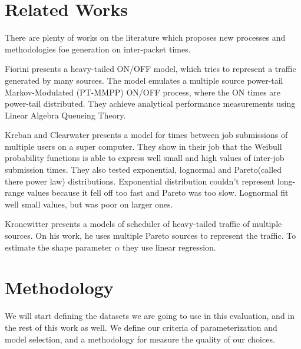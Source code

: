 \section{Related Works}

There are plenty of works on the literature which proposes new processes and methodologies foe generation on inter-packet times.

Fiorini \cite{modeling-concurrent-heavy-tailed} presents a heavy-tailed ON/OFF model, which tries to represent a traffic generated by many sources. The model emulates a multiple source power-tail Markov-Modulated (PT-MMPP) ON/OFF process, where the ON times are power-tail distributed. They achieve analytical performance measurements using Linear Algebra Queueing Theory.

Kreban and Clearwater\cite{hierarchical-dynamics-interarrival-times} presents a model for times between job submissions of multiple users on a super computer. They show in their job that the Weibull probability functions is able to express well small and high values of inter-job submission times. They also tested exponential, lognormal and Pareto(called there power law) distributions. Exponential distribution couldn't  represent long-range values because it fell off too fast and Pareto was too slow. Lognormal fit well small values, but was poor on larger ones.    

Kronewitter\cite{optimal-scheduling-of-heavy-tailed-traffic} presents a models of scheduler of heavy-tailed traffic of multiple sources. On his work, he uses multiple Pareto sources to represent the traffic. To estimate the shape parameter $\alpha$ they use linear regression.





\section{Methodology}

We will start defining the datasets we are going to use in this evaluation, and in the rest of this work as well. We define our criteria of parameterization and model selection, and a methodology for measure the quality of our choices. 



